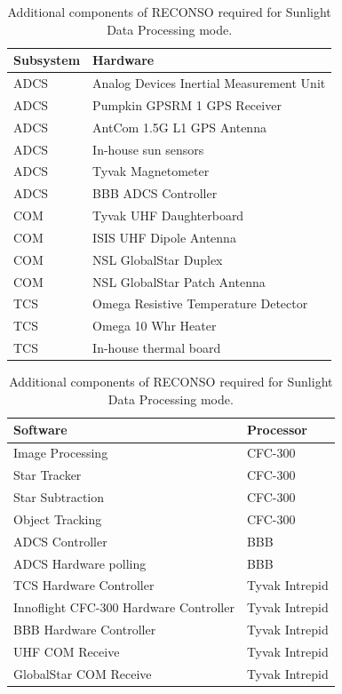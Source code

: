 \documentclass{article}
\begin{document}
\begin{table}[h!]
\caption{Additional components of RECONSO required for Sunlight Data Processing mode.}
\begin{adjustbox}{center}
\begin{tabular}{|l|l|}
\hline
Subsystem & Hardware \\ \hline \hline
ADCS & Analog Devices Inertial Measurement Unit  \\ \hline
ADCS & Pumpkin GPSRM 1 GPS Receiver \\ \hline
ADCS & AntCom 1.5G L1 GPS Antenna  \\ \hline
ADCS & In-house sun sensors  \\ \hline
ADCS & Tyvak Magnetometer \\ \hline
ADCS & BBB ADCS Controller \\ \hline \hline
COM & Tyvak UHF Daughterboard  \\ \hline
COM & ISIS UHF Dipole Antenna  \\ \hline
COM & NSL GlobalStar Duplex  \\ \hline
COM & NSL GlobalStar Patch Antenna \\ \hline \hline
TCS & Omega Resistive Temperature Detector \\ \hline
TCS & Omega 10 Whr Heater  \\ \hline
TCS & In-house thermal board \\ \hline
\end{tabular}

\quad

\begin{tabular}{|l|l|}
\hline
Software & Processor \\ \hline \hline
Image Processing & CFC-300 \\ \hline
Star Tracker & CFC-300 \\ \hline
Star Subtraction & CFC-300 \\ \hline
Object Tracking & CFC-300 \\ \hline \hline
ADCS Controller & BBB \\ \hline
ADCS Hardware polling & BBB \\ \hline \hline
TCS Hardware Controller & Tyvak Intrepid \\ \hline
Innoflight CFC-300 Hardware Controller & Tyvak Intrepid \\ \hline
BBB Hardware Controller & Tyvak Intrepid \\ \hline
UHF COM Receive & Tyvak Intrepid \\ \hline
GlobalStar COM Receive & Tyvak Intrepid \\ \hline
\end{tabular}
\end{adjustbox}
\end{table}
\end{document}
